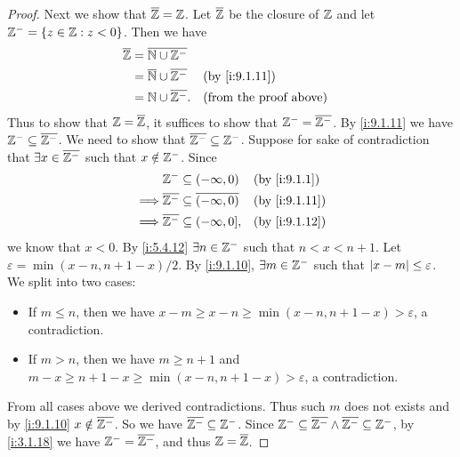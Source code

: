 \begin{proof}
  Next we show that \(\overline{\mathbb{Z}} = \mathbb{Z}\).
  Let \(\overline{\mathbb{Z}}\) be the closure of \(\mathbb{Z}\) and let \(\mathbb{Z}^- = \left\lbrace z \in \mathbb{Z} : z < 0\right\rbrace\).
  Then we have
  \begin{align*}
    \overline{\Z} & = \overline{\N \cup \Z^-}                                               \\
                  & = \overline{\N} \cup \overline{\Z^-} &  & \by{i:9.1.11}                 \\
                  & = \N \cup \overline{\Z^-}.           &  & \text{(from the proof above)}
  \end{align*}
  Thus to show that \(\mathbb{Z} = \overline{\mathbb{Z}}\), it suffices to show that \(\mathbb{Z}^- = \overline{\mathbb{Z}^-}\).
  By \cref{i:9.1.11} we have \(\mathbb{Z}^- \subseteq \overline{\mathbb{Z}^-}\).
  We need to show that \(\overline{\mathbb{Z}^-} \subseteq \mathbb{Z}^-\).
  Suppose for sake of contradiction that \(\exists x \in \overline{\mathbb{Z}^-}\) such that \(x \notin \mathbb{Z}^-\).
  Since
  \begin{align*}
             & \Z^- \subseteq (-\infty, 0)                       &  & \by{i:9.1.1}  \\
    \implies & \overline{\Z^-} \subseteq \overline{(-\infty, 0)} &  & \by{i:9.1.11} \\
    \implies & \overline{\Z^-} \subseteq (-\infty, 0],           &  & \by{i:9.1.12}
  \end{align*}
  we know that \(x < 0\).
  By \cref{i:5.4.12} \(\exists n \in \mathbb{Z}^-\) such that \(n < x < n + 1\).
  Let \(\varepsilon = \min(x - n, n + 1 - x) / 2\).
  By \cref{i:9.1.10}, \(\exists m \in \mathbb{Z}^-\) such that \(\left\lvert x - m\right\rvert \leq \varepsilon\).
  We split into two cases:
  \begin{itemize}
    \item If \(m \leq n\), then we have \(x - m \geq x - n \geq \min(x - n, n + 1 - x) > \varepsilon\), a contradiction.
    \item If \(m > n\), then we have \(m \geq n + 1\) and \(m - x \geq n + 1 - x \geq \min(x - n, n + 1 - x) > \varepsilon\), a contradiction.
  \end{itemize}
  From all cases above we derived contradictions.
  Thus such \(m\) does not exists and by \cref{i:9.1.10} \(x \notin \overline{\mathbb{Z}^-}\).
  So we have \(\overline{\mathbb{Z}^-} \subseteq \mathbb{Z}^-\).
  Since \(\mathbb{Z}^- \subseteq \overline{\mathbb{Z}^-} \land \overline{\mathbb{Z}^-} \subseteq \mathbb{Z}^-\), by \cref{i:3.1.18} we have \(\mathbb{Z}^- = \overline{\mathbb{Z}^-}\), and thus \(\mathbb{Z} = \overline{\mathbb{Z}}\).


\end{proof}
